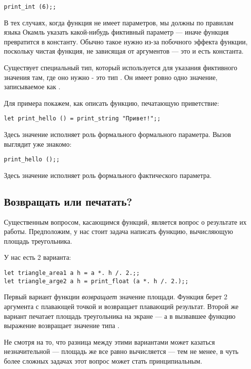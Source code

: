 \begin{verbatim}
print_int (6);;
\end{verbatim}

В тех случаях, когда функция не имеет параметров, мы должны по правилам
языка Окамль указать какой-нибудь фиктивный параметр --- иначе функция
превратится в константу. Обычно такое нужно из-за побочного эффекта
функции, поскольку чистая функция, не зависящая от аргументов --- это
и есть константа.

Существует специальный тип, который используется для указания
фиктивного значения там, где оно нужно - это тип . Он имеет ровно 
одно значение, записываемое как \s{()}.

Для примера покажем, как описать функцию, печатающую приветствие:

\begin{verbatim}
let print_hello () = print_string "Привет!";;
\end{verbatim}

Здесь значение \s{()} исполняет роль формального формального параметра.
Вызов выглядит уже знакомо:

\begin{verbatim}
print_hello ();;
\end{verbatim}

Здесь значение \s{()} исполняет роль формального фактического параметра.

\subsection{Возвращать или печатать?}

Существенным вопросом, касающимся функций, является вопрос о результате
их работы. Предположим, у нас стоит задача написать функцию, вычисляющую
площадь треугольника.

У нас есть 2 варианта:
\begin{verbatim}
let triangle_area1 a h = a *. h /. 2.;;
let triangle_arge2 a h = print_float (a *. h /. 2.);;
\end{verbatim}

Первый вариант функции \emph{возвращает} значение площади. 
Функция  берет 2 аргумента с плавающей точкой и 
возвращает плавающий результат.
Второй же вариант печатает площадь треугольника на экране --- а в вызвавшее
функцию выражение возвращает значение типа . 

Не смотря на то, что разница между этими вариантами может казаться 
незначительной --- площадь же все равно вычисляется --- тем не менее, 
в чуть более сложных задачах этот вопрос может стать принципиальным.

